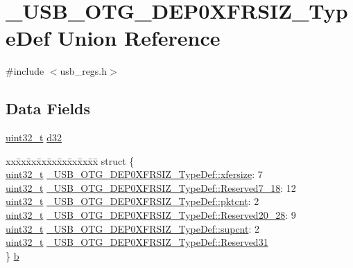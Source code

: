 \hypertarget{union___u_s_b___o_t_g___d_e_p0_x_f_r_s_i_z___type_def}{\section{\-\_\-\-U\-S\-B\-\_\-\-O\-T\-G\-\_\-\-D\-E\-P0\-X\-F\-R\-S\-I\-Z\-\_\-\-Type\-Def Union Reference}
\label{union___u_s_b___o_t_g___d_e_p0_x_f_r_s_i_z___type_def}
}


{\ttfamily \#include $<$usb\-\_\-regs.\-h$>$}

\subsection*{Data Fields}
\begin{DoxyCompactItemize}
\item 
\hyperlink{stdint_8h_a435d1572bf3f880d55459d9805097f62}{uint32\-\_\-t} \hyperlink{group___u_s_b___o_t_g___d_r_i_v_e_r_ga0ee1cacbd541f2985a9648dba956963b}{d32}
\item 
\begin{tabbing}
xx\=xx\=xx\=xx\=xx\=xx\=xx\=xx\=xx\=\kill
struct \{\\
\>\hyperlink{stdint_8h_a435d1572bf3f880d55459d9805097f62}{uint32\_t} \hyperlink{group___u_s_b___o_t_g___d_r_i_v_e_r_gab17c78134e88fbefa976bb6f780c52f4}{\_USB\_OTG\_DEP0XFRSIZ\_TypeDef::xfersize}: 7\\
\>\hyperlink{stdint_8h_a435d1572bf3f880d55459d9805097f62}{uint32\_t} \hyperlink{group___u_s_b___o_t_g___d_r_i_v_e_r_ga709b318e2fe53d1ccbbb6a274f7cdf9b}{\_USB\_OTG\_DEP0XFRSIZ\_TypeDef::Reserved7\_18}: 12\\
\>\hyperlink{stdint_8h_a435d1572bf3f880d55459d9805097f62}{uint32\_t} \hyperlink{group___u_s_b___o_t_g___d_r_i_v_e_r_ga903035f15b46865c694e6f28bceb81d6}{\_USB\_OTG\_DEP0XFRSIZ\_TypeDef::pktcnt}: 2\\
\>\hyperlink{stdint_8h_a435d1572bf3f880d55459d9805097f62}{uint32\_t} \hyperlink{group___u_s_b___o_t_g___d_r_i_v_e_r_ga23f2271c3de7c9cc663775ed61507f29}{\_USB\_OTG\_DEP0XFRSIZ\_TypeDef::Reserved20\_28}: 9\\
\>\hyperlink{stdint_8h_a435d1572bf3f880d55459d9805097f62}{uint32\_t} \hyperlink{group___u_s_b___o_t_g___d_r_i_v_e_r_ga102cb1f6b08dacfa40ee191b386a42e1}{\_USB\_OTG\_DEP0XFRSIZ\_TypeDef::supcnt}: 2\\
\>\hyperlink{stdint_8h_a435d1572bf3f880d55459d9805097f62}{uint32\_t} \hyperlink{group___u_s_b___o_t_g___d_r_i_v_e_r_ga6d6ad8f751aee7074cdbce99708c75b6}{\_USB\_OTG\_DEP0XFRSIZ\_TypeDef::Reserved31}\\
\} \hyperlink{group___u_s_b___o_t_g___d_r_i_v_e_r_ga8b05bc8e548328734af4179f180c5b07}{b}\\

\end{tabbing}\end{DoxyCompactItemize}


